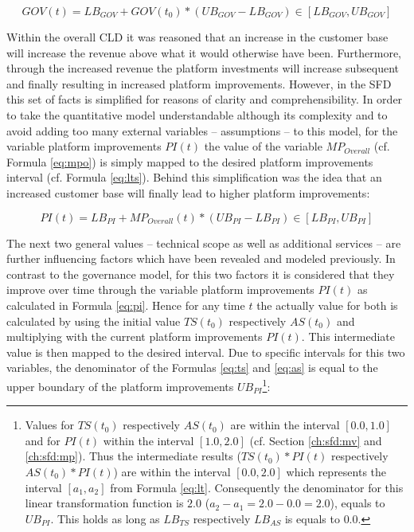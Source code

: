 \begin{equation}\label{eq:gov}
	GOV(t) = LB_{GOV} + GOV(t_0) * (UB_{GOV} - LB_{GOV}) \in [LB_{GOV},UB_{GOV}]
\end{equation}

Within the overall \ac{CLD} it was reasoned that an increase in the customer base will increase the revenue above what it would otherwise have been. Furthermore, through the increased revenue the platform investments will increase subsequent and finally resulting in increased platform improvements. However, in the \ac{SFD} this set of facts is simplified for reasons of clarity and comprehensibility. In order to take the quantitative model understandable although its complexity and to avoid adding too many external variables -- assumptions -- to this model, for the variable  platform improvements $PI(t)$ the value of the variable $MP_{Overall}$ (cf. Formula \ref{eq:mpo}) is simply mapped to the desired platform improvements interval (cf. Formula \ref{eq:lts}). Behind this simplification was the idea that an increased customer base will finally lead to higher platform improvements:

\begin{equation}\label{eq:pi}
	PI(t) = LB_{PI} + MP_{Overall}(t) * (UB_{PI} - LB_{PI}) \in [LB_{PI},UB_{PI}]
\end{equation}

The next two general values -- technical scope as well as additional services -- are further influencing factors which have been revealed and modeled previously. In contrast to the governance model, for this two factors it is considered that they improve over time through the variable platform improvements $PI(t)$ as calculated in Formula \ref{eq:pi}. Hence for any time $t$ the actually value for both is calculated by using the initial value $TS(t_0)$ respectively $ AS(t_0)$ and multiplying with the current platform improvements $PI(t)$. This intermediate value is then mapped to the desired interval. Due to specific intervals for this two variables, the denominator of the Formulas \ref{eq:ts} and \ref{eq:as} is equal to the upper boundary of the platform improvements $UB_{PI}$\footnote{Values for $TS(t_0)$ respectively $AS(t_0)$ are within the interval $[0.0,1.0]$ and for $PI(t)$ within the interval $[1.0,2.0]$ (cf. Section \ref{ch:sfd:mv} and \ref{ch:sfd:mp}). Thus the intermediate results ($TS(t_0)*PI(t)$ respectively $AS(t_0) *PI(t)$) are within the interval $[0.0,2.0]$ which represents the interval $[a_1,a_2]$ from Formula \ref{eq:lt}. Consequently the denominator for this linear transformation function is $2.0$ ($a_2 - a_1 = 2.0 - 0.0 = 2.0$), equals to $UB_{PI}$. This holds as long as $LB_{TS}$ respectively $LB_{AS}$ is equals to $0.0$.}:

